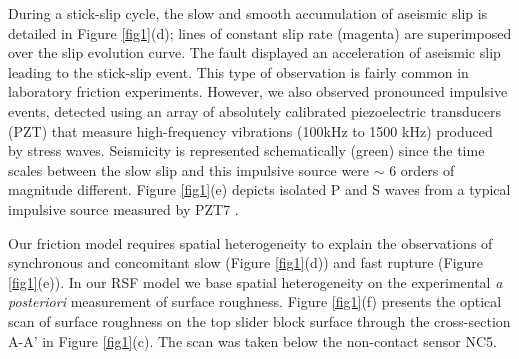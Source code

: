 \documentclass[preprint,1p, 10pt,authoryear]{elsarticle}
\begin{document}
During a stick-slip cycle, the slow and smooth accumulation of aseismic slip is detailed in Figure \ref{fig1}(d); lines of constant slip rate (magenta) are superimposed over the slip evolution curve.  The fault displayed an acceleration of aseismic slip leading to the stick-slip event. This type of observation is fairly common in laboratory friction experiments. However, we also observed pronounced impulsive events, detected using an array of absolutely calibrated piezoelectric transducers (PZT) that measure high-frequency vibrations (100kHz to 1500 kHz) produced by stress waves. Seismicity is represented schematically (green) since the time scales between the slow slip and this impulsive source were $\sim$ 6 orders of magnitude different.  Figure \ref{fig1}(e) depicts isolated P and S waves from a typical impulsive source measured by PZT7  \citep{Selvadurai2019}.
 
Our friction model requires spatial heterogeneity to explain the observations of synchronous and concomitant slow (Figure \ref{fig1}(d)) and fast rupture (Figure \ref{fig1}(e)). In our RSF model we base spatial heterogeneity  on the experimental \textit{a posteriori} measurement of surface roughness. Figure \ref{fig1}(f) presents the optical scan of surface roughness on the top slider block surface through the cross-section A-A' in Figure \ref{fig1}(c). The scan was taken below the non-contact sensor NC5.
\end{document}
